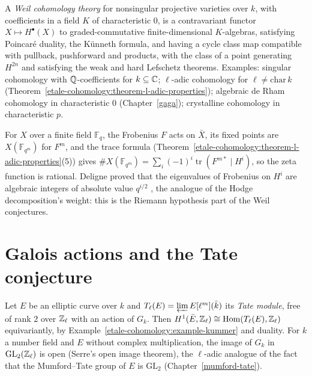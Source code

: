 \begin{definition}\label{etale-cohomology:definition-weil-cohomology}
A \emph{Weil cohomology theory} for nonsingular projective varieties over $k$, with coefficients in a field $K$ of characteristic $0$, is a contravariant functor
$X \mapsto H^\bullet(X)$ to graded-commutative finite-dimensional $K$-algebras, satisfying Poincar\'e duality, the K\"unneth formula, and having a cycle class map compatible with pullback,
pushforward and products, with the class of a point generating $H^{2n}$ and satisfying the weak and hard Lefschetz theorems. Examples: singular cohomology with $\mathbb{Q}$-coefficients for
$k \subseteq \mathbb{C}$; $\ell$-adic cohomology for $\ell \neq \mathrm{char}\,k$ (Theorem~\ref{etale-cohomology:theorem-l-adic-properties}); algebraic de Rham cohomology in characteristic $0$
(Chapter~\ref{gaga}); crystalline cohomology in characteristic $p$.
\end{definition}

\begin{remark}\label{etale-cohomology:remark-weil-conjectures}
For $X$ over a finite field $\mathbb{F}_q$, the Frobenius $F$ acts on $\bar X$, its fixed points are $X(\mathbb{F}_{q^m})$ for $F^m$, and the trace formula
(Theorem~\ref{etale-cohomology:theorem-l-adic-properties}(5)) gives $\#X(\mathbb{F}_{q^m}) = \sum_i(-1)^i\operatorname{tr}(F^{m*} \mid H^i)$, so the zeta function is rational. Deligne proved that the
eigenvalues of Frobenius on $H^i$ are algebraic integers of absolute value $q^{i/2}$ \cite{deligne-weil-1}, the analogue of the Hodge decomposition's weight: this is the
Riemann hypothesis part of the Weil conjectures.
\end{remark}

\section{Galois actions and the Tate conjecture}\label{etale-cohomology:section-galois}

\begin{example}\label{etale-cohomology:example-tate-module}
Let $E$ be an elliptic curve over $k$ and $T_\ell(E) = \varprojlim E[\ell^m](\bar k)$ its \emph{Tate module}, free of rank $2$ over $\mathbb{Z}_\ell$ with an action of $G_k$. Then
$H^1(\bar E, \mathbb{Z}_\ell) \cong \operatorname{Hom}(T_\ell(E), \mathbb{Z}_\ell)$ equivariantly, by Example~\ref{etale-cohomology:example-kummer} and duality. For $k$ a number field and $E$ without complex
multiplication, the image of $G_k$ in $\mathrm{GL}_2(\mathbb{Z}_\ell)$ is open (Serre's open image theorem), the $\ell$-adic analogue of the fact that the Mumford--Tate group of $E$ is
$\mathrm{GL}_2$ (Chapter~\ref{mumford-tate}).
\end{example}

